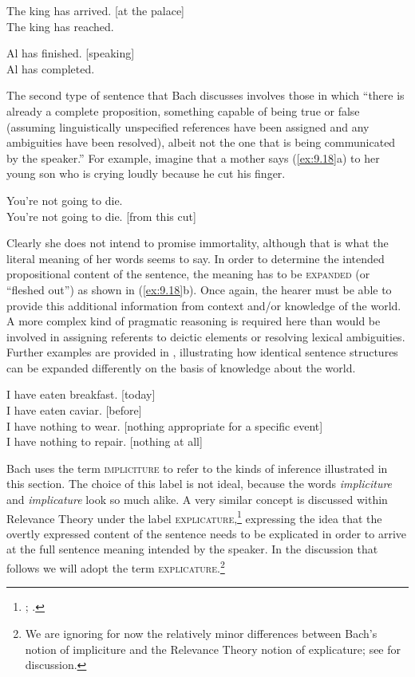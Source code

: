 \ea \label{ex:9.16}
\ea The king has arrived. [at the palace]\\
\ex *The king has reached.
                       \z
\z

\ea \label{ex:9.17}
\ea Al has finished. [speaking]\\
\ex *Al has completed.
                       \z
\z


The second type of sentence that Bach discusses involves those in which “there is already a complete proposition, something capable of being true or false (assuming linguistically unspecified references have been assigned and any ambiguities have been resolved), albeit not the one that is being communicated by the speaker.” For example, imagine that a mother says (\ref{ex:9.18}a) to her young son who is crying loudly because he cut his finger.


\ea \label{ex:9.18}
\ea You’re not going to die.\\
\ex You’re not going to die. [from this cut]
                       \z
\z


Clearly she does not intend to promise immortality, although that is what the literal meaning of her words seems to say. In order to determine the intended propositional content of the sentence, the meaning has to be \textsc{expanded} (or “fleshed out”) as shown in (\ref{ex:9.18}b). Once again, the hearer must be able to provide this additional information from context and/or knowledge of the world. A more complex kind of pragmatic reasoning is required here than would be involved in assigning referents to deictic elements or resolving lexical ambiguities. Further examples are provided in , illustrating how identical sentence structures can be expanded differently on the basis of knowledge about the world.


\ea \label{ex:9.18}
\ea I have eaten breakfast. [today]\\
\ex I have eaten caviar. [before]\\
\ex I have nothing to wear. [nothing appropriate for a specific event]\\
\ex I have nothing to repair. [nothing at all]
                       \z
\z


Bach uses the term \textsc{impliciture} to refer to the kinds of inference illustrated in this section. The choice of this label is not ideal, because the words \textit{impliciture} and \textit{implicature} look so much alike. A very similar concept is discussed within Relevance Theory under the label \textsc{explicature},\footnote{\citet{SperberWilson1986}; \citet{Carston1988}.} expressing the idea that the overtly expressed content of the sentence needs to be explicated in order to arrive at the full sentence meaning intended by the speaker. In the discussion that follows we will adopt the term \textsc{explicature}.\footnote{We are ignoring for now the relatively minor differences between Bach’s notion of impliciture and the Relevance Theory notion of explicature; see \citet{Bach2010} for discussion.}



